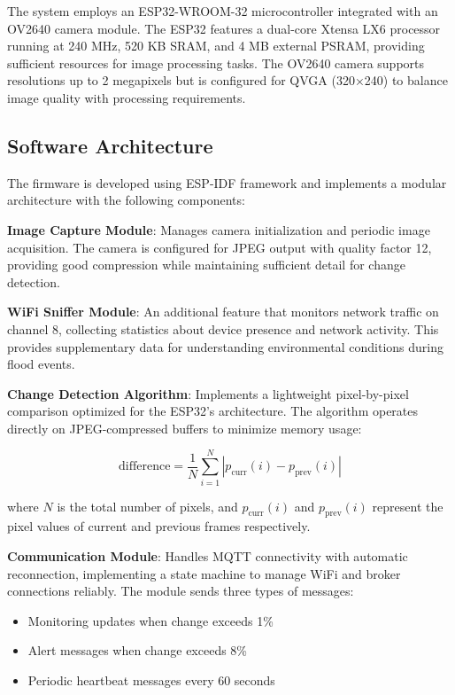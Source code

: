 \documentclass[conference]{IEEEtran}
\begin{document}
The system employs an ESP32-WROOM-32 microcontroller integrated with an OV2640 camera module. The ESP32 features a dual-core Xtensa LX6 processor running at 240 MHz, 520 KB SRAM, and 4 MB external PSRAM, providing sufficient resources for image processing tasks. The OV2640 camera supports resolutions up to 2 megapixels but is configured for QVGA (320×240) to balance image quality with processing requirements.

\subsection{Software Architecture}

The firmware is developed using ESP-IDF framework and implements a modular architecture with the following components:

\textbf{Image Capture Module}: Manages camera initialization and periodic image acquisition. The camera is configured for JPEG output with quality factor 12, providing good compression while maintaining sufficient detail for change detection.

\textbf{WiFi Sniffer Module}: An additional feature that monitors network traffic on channel 8, collecting statistics about device presence and network activity. This provides supplementary data for understanding environmental conditions during flood events.

\textbf{Change Detection Algorithm}: Implements a lightweight pixel-by-pixel comparison optimized for the ESP32's architecture. The algorithm operates directly on JPEG-compressed buffers to minimize memory usage:

\begin{equation}
\text{difference} = \frac{1}{N} \sum_{i=1}^{N} |p_{\text{curr}}(i) - p_{\text{prev}}(i)|
\end{equation}

where $N$ is the total number of pixels, and $p_{\text{curr}}(i)$ and $p_{\text{prev}}(i)$ represent the pixel values of current and previous frames respectively.

\textbf{Communication Module}: Handles MQTT connectivity with automatic reconnection, implementing a state machine to manage WiFi and broker connections reliably. The module sends three types of messages:
\begin{itemize}
\item Monitoring updates when change exceeds 1\%
\item Alert messages when change exceeds 8\%
\item Periodic heartbeat messages every 60 seconds
\end{itemize}
\end{document}
